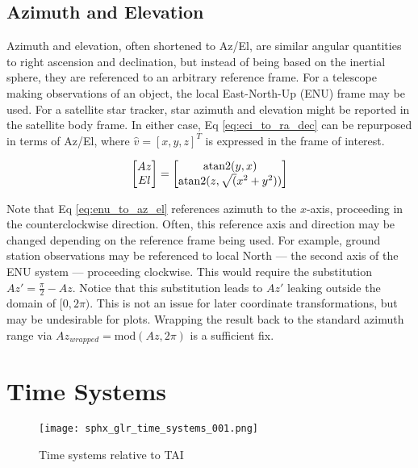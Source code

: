\subsection{Azimuth and Elevation}

Azimuth and elevation, often shortened to Az/El, are similar angular quantities to right ascension and declination, but instead of being based on
the inertial sphere, they are referenced to an arbitrary reference frame. For a telescope making
observations of an object, the local East-North-Up (ENU) frame may be used. For a satellite star
tracker, star azimuth and elevation might be reported in the satellite body frame. In either case,
Eq \ref{eq:eci_to_ra_dec} can be repurposed in terms of Az/El, where $\hat{v} = \left[ x, y, z
\right]^T$ is expressed in the frame of interest.

\begin{equation} \label{eq:enu_to_az_el}
  \begin{bmatrix}
	Az \\
	El
  \end{bmatrix} = 
  \begin{bmatrix}
	\operatorname{atan2}(y, x) \\
	\operatorname{atan2}(z, \sqrt(x^2 + y^2))
  \end{bmatrix}
\end{equation}

Note that Eq \ref{eq:enu_to_az_el} references azimuth to the $x$-axis, proceeding in the
counterclockwise direction. Often, this reference axis and direction may be changed depending on the
reference frame being used. For example, ground station observations may be referenced to local
North ---  the second axis of the ENU system ---  proceeding clockwise. This would require the
substitution $Az' = \frac{\pi}{2} - Az$. Notice that this substitution leads to $Az'$ leaking
outside the domain of $[0, 2\pi)$. This is not an issue for later coordinate transformations, but
may be undesirable for plots. Wrapping the result back to the standard azimuth range via
$Az_{wrapped} = \textrm{mod}(Az, 2\pi)$ is a sufficient fix.

\section{Time Systems}

\begin{figure}[ht]
  \centering
  \texttt{[image: sphx\_glr\_time\_systems\_001.png]}
  \caption{Time systems relative to TAI}
  \label{fig:time_systems}
\end{figure}